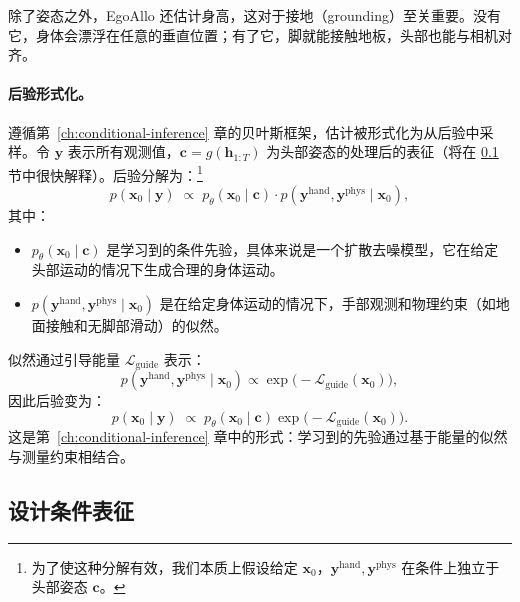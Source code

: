 \documentclass[../../book-main_zh.tex]{subfiles}
\begin{document}
除了姿态之外，EgoAllo 还估计身高，这对于接地（grounding）至关重要。没有它，身体会漂浮在任意的垂直位置；有了它，脚就能接触地板，头部也能与相机对齐。

\paragraph{后验形式化。}
遵循第~\ref{ch:conditional-inference} 章的贝叶斯框架，估计被形式化为从后验中采样。令 $\boldsymbol{y}$ 表示所有观测值，$\boldsymbol{c} = g(\boldsymbol{h}_{1:T})$ 为头部姿态的处理后的表征（将在 \ref{sub:egoallo_representation} 节中很快解释）。后验分解为：\footnote{为了使这种分解有效，我们本质上假设给定 $\boldsymbol{x}_0$，$\boldsymbol{y}^{\text{hand}}, \boldsymbol{y}^{\text{phys}}$ 在条件上独立于头部姿态 $\boldsymbol{c}$。}
\begin{equation}
    p(\boldsymbol{x}_0 \mid \boldsymbol{y}) \;\propto\; p_\theta(\boldsymbol{x}_0 \mid
    \boldsymbol{c}) \cdot p(\boldsymbol{y}^{\text{hand}},
    \boldsymbol{y}^{\text{phys}} \mid \boldsymbol{x}_0),
\end{equation}
其中：
\begin{itemize}
    \item $p_\theta(\boldsymbol{x}_0 \mid \boldsymbol{c})$ 是学习到的条件先验，具体来说是一个扩散去噪模型，它在给定头部运动的情况下生成合理的身体运动。
    \item $p(\boldsymbol{y}^{\text{hand}}, \boldsymbol{y}^{\text{phys}} \mid
        \boldsymbol{x}_0)$ 是在给定身体运动的情况下，手部观测和物理约束（如地面接触和无脚部滑动）的似然。
\end{itemize}

似然通过引导能量 $\mathcal{L}_{\text{guide}}$ 表示：
\begin{equation}
    p(\boldsymbol{y}^{\text{hand}}, \boldsymbol{y}^{\text{phys}} \mid
    \boldsymbol{x}_0) \propto \exp\big(-\mathcal{L}_{\text{guide}}(\boldsymbol{x}_0)\big),
\end{equation}
因此后验变为：
\begin{equation}
    \label{eq:egoallo_posterior}
    p(\boldsymbol{x}_0 \mid \boldsymbol{y}) \;\propto\; p_\theta(\boldsymbol{x}_0 \mid
    \boldsymbol{c}) \exp\big(-\mathcal{L}_{\text{guide}}(\boldsymbol{x}_0)\big).
\end{equation}
这是第~\ref{ch:conditional-inference} 章中的形式：学习到的先验通过基于能量的似然与测量约束相结合。

\subsection{设计条件表征}
\label{sub:egoallo_representation}
\end{document}
